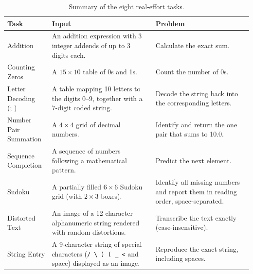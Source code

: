 \documentclass[12pt,a4paper]{article}
\begin{document}
\begin{table}[ht]
\centering\scriptsize
\caption{Summary of the eight real-effort tasks.}
\label{tab:tasks}
\renewcommand{\arraystretch}{1.8} 
\begin{tabularx}{\textwidth}{@{}lXX@{}}
\toprule
\textbf{Task} & \textbf{Input} & \textbf{Problem} \\
\midrule
\makecell[tl]{Addition \\ {\citep{niederle2007women}}} & An addition expression with 3 integer addends of up to 3 digits each. & Calculate the exact sum. \\
\makecell[tl]{Counting Zeros \\ {\citep{abeler2011reference}}} & A $15 \times 10$ table of 0s and 1s. & Count the number of 0s. \\
\makecell[tl]{Letter Decoding \\ {(\citealt{erkal2011relative};} )} & A table mapping 10 letters to the digits 0--9, together with a 7-digit coded string. & Decode the string back into the corresponding letters. \\
\makecell[tl]{Number Pair \\ Summation \\ {\citep{rosaz2016quitting}}} & A $4 \times 4$ grid of decimal numbers. & Identify and return the one pair that sums to 10.0. \\
\makecell[tl]{Sequence \\ Completion \\ {\citep{bracha2013}}} & A sequence of numbers following a mathematical pattern. & Predict the next element. \\
\makecell[tl]{Sudoku \\ {\citep{calsamiglia2013incentive}}} & A partially filled $6 \times 6$ Sudoku grid (with $2 \times 3$ boxes). & Identify all missing numbers and report them in reading order, space-separated. \\
\makecell[tl]{Distorted Text \\ {\citep{augenblick2015working}}} & An image of a 12-character alphanumeric string rendered with random distortions. & Transcribe the text exactly (case-insensitive). \\
\makecell[tl]{String Entry \\ {\citep{kessler2016tax}}} & A 9-character string of special characters (\texttt{/ \textbackslash{} ) ( \_ <} and space) displayed as an image. & Reproduce the exact string, including spaces. \\
\bottomrule
\end{tabularx}
\end{table}
\end{document}
